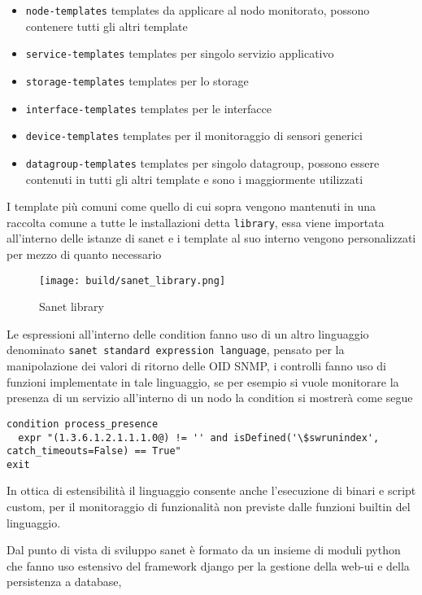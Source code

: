 \begin{itemize}
  \item \verb|node-templates| templates da applicare al nodo monitorato, possono contenere tutti gli altri template
  \item \verb|service-templates| templates per singolo servizio applicativo
  \item \verb|storage-templates| templates per lo storage
  \item \verb|interface-templates| templates per le interfacce
  \item \verb|device-templates| templates per il monitoraggio di sensori generici
  \item \verb|datagroup-templates| templates per singolo datagroup, possono essere contenuti in tutti gli altri template e sono i maggiormente utilizzati
\end{itemize}

I template più comuni come quello di cui sopra vengono mantenuti in una raccolta comune a tutte le installazioni detta \verb|library|, essa viene importata all'interno delle istanze di sanet e i template al suo interno vengono personalizzati per mezzo di quanto necessario

\begin{figure}[H]
    \centering
    \texttt{[image: build/sanet\_library.png]}
    \caption{Sanet library}
    \label{fig:enter-label}
\end{figure}

Le espressioni all'interno delle condition fanno uso di un altro linguaggio denominato \verb|sanet standard expression language|, pensato per la manipolazione dei valori di ritorno delle OID SNMP, i controlli fanno uso di funzioni implementate in tale linguaggio, se per esempio si vuole monitorare la presenza di un servizio all'interno di un nodo la condition si mostrerà come segue

\begin{lstlisting}
condition process_presence
  expr "(1.3.6.1.2.1.1.1.0@) != '' and isDefined('\$swrunindex', catch_timeouts=False) == True"
exit
\end{lstlisting}

In ottica di estensibilità il linguaggio consente anche l'esecuzione di binari e script custom, per il monitoraggio di funzionalità non previste dalle funzioni builtin del linguaggio.

Dal punto di vista di sviluppo sanet è formato da un insieme di moduli python che fanno uso estensivo del framework django per la gestione della web-ui e della persistenza a database,

